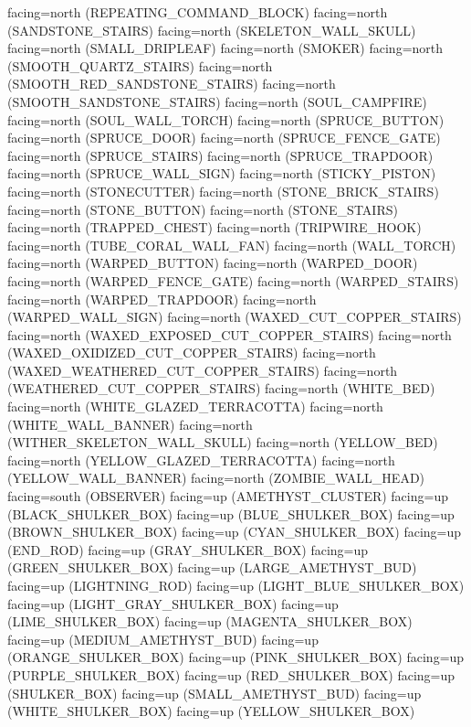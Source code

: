 \documentclass[11pt]{article}
\begin{document}
facing=north (REPEATING_COMMAND_BLOCK)
facing=north (SANDSTONE_STAIRS)
facing=north (SKELETON_WALL_SKULL)
facing=north (SMALL_DRIPLEAF)
facing=north (SMOKER)
facing=north (SMOOTH_QUARTZ_STAIRS)
facing=north (SMOOTH_RED_SANDSTONE_STAIRS)
facing=north (SMOOTH_SANDSTONE_STAIRS)
facing=north (SOUL_CAMPFIRE)
facing=north (SOUL_WALL_TORCH)
facing=north (SPRUCE_BUTTON)
facing=north (SPRUCE_DOOR)
facing=north (SPRUCE_FENCE_GATE)
facing=north (SPRUCE_STAIRS)
facing=north (SPRUCE_TRAPDOOR)
facing=north (SPRUCE_WALL_SIGN)
facing=north (STICKY_PISTON)
facing=north (STONECUTTER)
facing=north (STONE_BRICK_STAIRS)
facing=north (STONE_BUTTON)
facing=north (STONE_STAIRS)
facing=north (TRAPPED_CHEST)
facing=north (TRIPWIRE_HOOK)
facing=north (TUBE_CORAL_WALL_FAN)
facing=north (WALL_TORCH)
facing=north (WARPED_BUTTON)
facing=north (WARPED_DOOR)
facing=north (WARPED_FENCE_GATE)
facing=north (WARPED_STAIRS)
facing=north (WARPED_TRAPDOOR)
facing=north (WARPED_WALL_SIGN)
facing=north (WAXED_CUT_COPPER_STAIRS)
facing=north (WAXED_EXPOSED_CUT_COPPER_STAIRS)
facing=north (WAXED_OXIDIZED_CUT_COPPER_STAIRS)
facing=north (WAXED_WEATHERED_CUT_COPPER_STAIRS)
facing=north (WEATHERED_CUT_COPPER_STAIRS)
facing=north (WHITE_BED)
facing=north (WHITE_GLAZED_TERRACOTTA)
facing=north (WHITE_WALL_BANNER)
facing=north (WITHER_SKELETON_WALL_SKULL)
facing=north (YELLOW_BED)
facing=north (YELLOW_GLAZED_TERRACOTTA)
facing=north (YELLOW_WALL_BANNER)
facing=north (ZOMBIE_WALL_HEAD)
facing=south (OBSERVER)
facing=up (AMETHYST_CLUSTER)
facing=up (BLACK_SHULKER_BOX)
facing=up (BLUE_SHULKER_BOX)
facing=up (BROWN_SHULKER_BOX)
facing=up (CYAN_SHULKER_BOX)
facing=up (END_ROD)
facing=up (GRAY_SHULKER_BOX)
facing=up (GREEN_SHULKER_BOX)
facing=up (LARGE_AMETHYST_BUD)
facing=up (LIGHTNING_ROD)
facing=up (LIGHT_BLUE_SHULKER_BOX)
facing=up (LIGHT_GRAY_SHULKER_BOX)
facing=up (LIME_SHULKER_BOX)
facing=up (MAGENTA_SHULKER_BOX)
facing=up (MEDIUM_AMETHYST_BUD)
facing=up (ORANGE_SHULKER_BOX)
facing=up (PINK_SHULKER_BOX)
facing=up (PURPLE_SHULKER_BOX)
facing=up (RED_SHULKER_BOX)
facing=up (SHULKER_BOX)
facing=up (SMALL_AMETHYST_BUD)
facing=up (WHITE_SHULKER_BOX)
facing=up (YELLOW_SHULKER_BOX)
\end{document}
